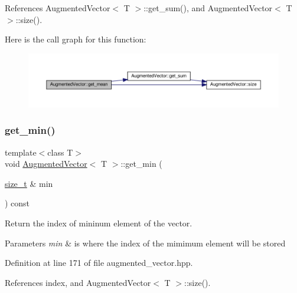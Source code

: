 References Augmented\+Vector$<$ T $>$\+::get\+\_\+sum(), and Augmented\+Vector$<$ T $>$\+::size().

Here is the call graph for this function\+:
\nopagebreak
\begin{figure}[H]
\begin{center}
\leavevmode
\includegraphics[width=350pt]{d1/d7a/classAugmentedVector_a5d6d742b8f707dd25ed0ad75208a2444_cgraph}
\end{center}
\end{figure}
\mbox{\label{classAugmentedVector_a1c29ec0db3858779d9b83f15c8c1d302}} 
\subsubsection{\texorpdfstring{get\+\_\+min()}{get\_min()}}
{\footnotesize\ttfamily template$<$class T$>$ \\
void \hyperlink{classAugmentedVector}{Augmented\+Vector}$<$ T $>$\+::get\+\_\+min (\begin{DoxyParamCaption}\item[{\hyperlink{tutorial__fpt__2017_2intro_2sixth_2test_8c_a7c94ea6f8948649f8d181ae55911eeaf}{size\+\_\+t} \&}]{min }\end{DoxyParamCaption}) const\hspace{0.3cm}{\ttfamily [inline]}}



Return the index of mininum element of the vector. 


\begin{DoxyParams}{Parameters}
{\em min} & is where the index of the mimimum element will be stored \\
\hline
\end{DoxyParams}


Definition at line 171 of file augmented\+\_\+vector.\+hpp.



References index, and Augmented\+Vector$<$ T $>$\+::size().

